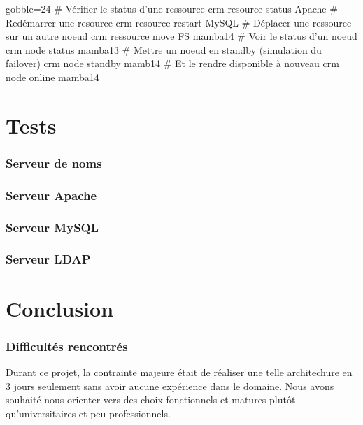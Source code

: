\documentclass[11pt,a4paper]{report}
\begin{document}
                    \begin{bashcode*}{gobble=24}
                        # Vérifier le status d'une ressource
                        crm resource status Apache
                        # Redémarrer une resource
                        crm resource restart MySQL
                        # Déplacer une ressource sur un autre noeud
                        crm ressource move FS mamba14
                        # Voir le status d'un noeud
                        crm node status mamba13
                        # Mettre un noeud en standby (simulation du failover)
                        crm node standby mamb14
                        # Et le rendre disponible à nouveau
                        crm node online mamba14
                    \end{bashcode*}
                    
    \part{Tests}
        \section{Serveur de noms}
        \section{Serveur Apache}
        \section{Serveur MySQL}
        \section{Serveur LDAP}
    \part{Conclusion}
        \section{Difficultés rencontrés}
            
            Durant ce projet, la contrainte majeure était de réaliser une telle architechure en 3 jours seulement sans avoir aucune expérience dans le domaine. Nous avons souhaité nous orienter vers des choix fonctionnels et matures plutôt qu'universitaires et peu professionnels.\\
            
\end{document}

